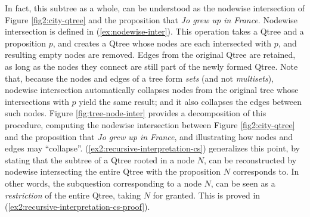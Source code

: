 In fact, this subtree as a whole, can be understood as the nodewise intersection of Figure \ref{fig2:city-qtree} and the proposition that \textit{Jo grew up in France}. Nodewise intersection is defined in (\ref{ex:nodewise-inter}). This operation takes a Qtree and a proposition $p$, and creates a Qtree whose nodes are each intersected with $p$, and resulting empty nodes are removed. Edges from the original Qtree are retained, as long as the nodes they connect are still part of the newly formed Qtree. Note that, because the nodes and edges of a tree form \textit{sets} (and not \textit{multisets}), nodewise intersection automatically collapses nodes from the original tree whose intersections with $p$ yield the same result; and it also collapses the edges between such nodes. Figure \ref{fig:tree-node-inter} provides a decomposition of this procedure, computing the nodewise intersection between Figure \ref{fig2:city-qtree} and the proposition that \textit{Jo grew up in France}, and illustrating how nodes and edges may ``collapse''. (\ref{ex2:recursive-interpretation-cs}) generalizes this point, by stating that the subtree of a Qtree rooted in a node $N$, can be reconstructed by nodewise intersecting the entire Qtree with the proposition $N$ corresponds to. In other words, the subquestion corresponding to a node $N$, can be seen as a \textit{restriction} of the entire Qtree, taking $N$ for granted. This is proved in (\ref{ex2:recursive-interpretation-cs-proof}).

\begin{exe}
	\label{ex:nodewise-inter}
\end{exe}

